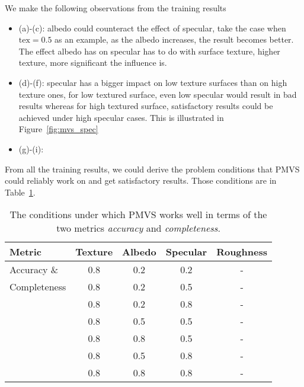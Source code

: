 We make the following observations from the training results
\begin{itemize}
\item (a)-(c): albedo could counteract the effect of specular, take the case when $\text{tex}=0.5$ as an example, as the albedo increases, the result becomes better. The effect albedo has on specular has to do with surface texture, \ie higher texture, more significant the influence is.
\item (d)-(f): specular has a bigger impact on low texture surfaces than on high texture ones, \ie for low textured surface, even low specular would result in bad results whereas for high textured surface, satisfactory results could be achieved under high specular cases. This is illustrated in Figure~\ref{fig:mvs_spec}
\item (g)-(i): 
\end{itemize}

From all the training results, we could derive the problem conditions that PMVS could reliably work on and get satisfactory results. Those conditions are in Table~\ref{tab:mvs_traing_result}.
\begin{table}[!htbp]
  \centering
  \begin{tabular}{l*{4}{c}}
  \hline
  \textbf{Metric} & Texture & Albedo & Specular & Roughness\\
  \hline
  Accuracy \&  & 0.8 & 0.2 & 0.2 & -\\
  Completeness & 0.8 & 0.2 & 0.5 & -\\
               & 0.8 & 0.2 & 0.8 & -\\
               & 0.8 & 0.5 & 0.5 & -\\
               & 0.8 & 0.8 & 0.5 & -\\
               & 0.8 & 0.5 & 0.8 & -\\
               & 0.8 & 0.8 & 0.8 & -\\
  \hline
  \end{tabular}
  \caption{The conditions under which PMVS works well in terms of the two metrics \textit{accuracy} and \textit{completeness}.}
  \label{tab:mvs_traing_result}
\end{table}

